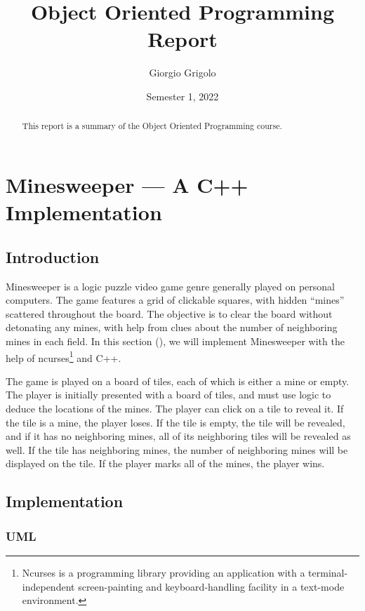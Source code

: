 \documentclass{article}
\title{Object Oriented Programming Report}
\author{Giorgio Grigolo}
\date{Semester 1, 2022}
\begin{document}
\maketitle
\begin{abstract}
This report is a summary of the Object Oriented Programming course.
\end{abstract}

\tableofcontents

\newpage

\section{Minesweeper --- A C++ Implementation}

\subsection{Introduction}
Minesweeper is a logic puzzle video game genre generally played on personal
computers. The game features a grid of clickable squares, with hidden ``mines''
scattered throughout the board. The objective is to clear the board without
detonating any mines, with help from clues about the number of neighboring
mines in each field.
In this section (\thesection), we will implement Minesweeper with the help of
ncurses\footnote{Ncurses is a programming library providing an application with a 
terminal-independent screen-painting and keyboard-handling facility in a
text-mode environment.} and C++.

The game is played on a board of tiles, each of which is either a mine or
empty. The player is initially presented with a board of tiles, and
must use logic to deduce the locations of the mines. The player can click on a
tile to reveal it. If the tile is a mine, the player loses. If the tile is
empty, the tile will be revealed, and if it has no neighboring mines, all of
its neighboring tiles will be revealed as well. If the tile has neighboring
mines, the number of neighboring mines will be displayed on the tile. If the player
marks all of the mines, the player wins.


\subsection{Implementation}

\subsubsection{UML}
\end{document}
